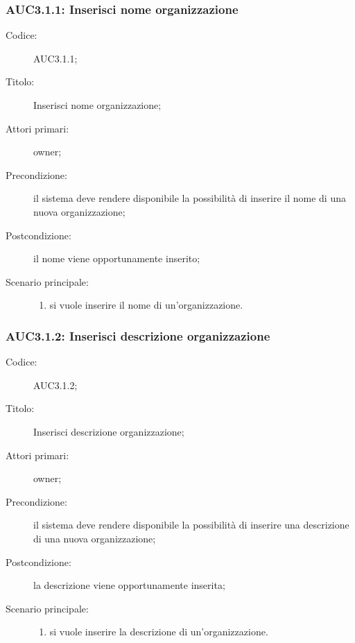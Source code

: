 \documentclass[../../../analisi-dei-requisiti.tex]{subfiles}
\begin{document}
\subsubsection{AUC3.1.1: Inserisci nome organizzazione}%
\label{subs:AUC3.1.1}
\begin{description}
  \item[Codice:] AUC3.1.1;
  \item[Titolo:] Inserisci nome organizzazione;
  \item[Attori primari:]  owner;
  \item[Precondizione:] il sistema deve rendere disponibile la possibilità di inserire il nome di una nuova organizzazione;
  \item[Postcondizione:] il nome viene opportunamente inserito;
  \item[Scenario principale:]
        \begin{enumerate}
          \item si vuole inserire il nome di un'organizzazione.
        \end{enumerate}

\end{description}

\subsubsection{AUC3.1.2: Inserisci descrizione organizzazione}%
\label{subs:AUC3.1.2}
\begin{description}
  \item[Codice:] AUC3.1.2;
  \item[Titolo:] Inserisci descrizione organizzazione;
  \item[Attori primari:] owner;
  \item[Precondizione:] il sistema deve rendere disponibile la possibilità di inserire una descrizione di una nuova organizzazione;
  \item[Postcondizione:] la descrizione viene opportunamente inserita;
  \item[Scenario principale:]
        \begin{enumerate}
          \item si vuole inserire la descrizione di un'organizzazione.
        \end{enumerate}
\end{description}
\end{document}
